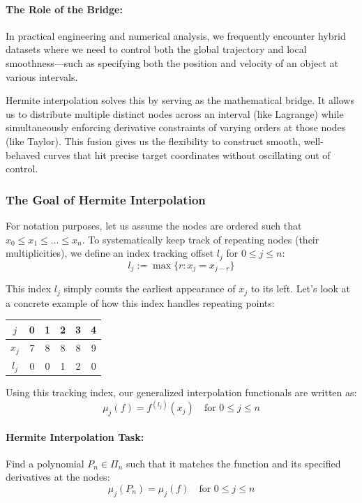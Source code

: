 \documentclass{article}
\begin{document}
\paragraph{The Role of the Bridge:} In practical engineering and numerical analysis, we frequently encounter hybrid datasets where we need to control both the global trajectory and local smoothness—such as specifying both the position and velocity of an object at various intervals. 

Hermite interpolation solves this by serving as the mathematical bridge. It allows us to distribute multiple distinct nodes across an interval (like Lagrange) while simultaneously enforcing derivative constraints of varying orders at those nodes (like Taylor). This fusion gives us the flexibility to construct smooth, well-behaved curves that hit precise target coordinates without oscillating out of control.

\subsubsection{The Goal of Hermite Interpolation}
For notation purposes, let us assume the nodes are ordered such that $x_0 \leq x_1 \leq \dots \leq x_n$. To systematically keep track of repeating nodes (their multiplicities), we define an index tracking offset $l_j$ for $0 \leq j \leq n$:
\[l_j := \max\{r : x_j = x_{j-r}\}\]

This index $l_j$ simply counts the earliest appearance of $x_j$ to its left. Let's look at a concrete example of how this index handles repeating points:

\begin{center}
  \begin{tabular}{|c|c|c|c|c|c|}
    \hline
    $j$ & 0 & 1 & 2 & 3 & 4 \\
    \hline
    $x_j$ & 7 & 8 & 8 & 8 & 9 \\
    \hline
    $l_j$ & 0 & 0 & 1 & 2 & 0 \\
    \hline
  \end{tabular}
\end{center}

Using this tracking index, our generalized interpolation functionals are written as:
\[\mu_j(f) = f^{(l_j)}(x_j) \quad \text{for } 0 \leq j \leq n\]

\paragraph{Hermite Interpolation Task:} Find a polynomial $P_n \in \Pi_n$ such that it matches the function and its specified derivatives at the nodes: 
\[\mu_j(P_n) = \mu_j(f) \quad \text{for } 0 \leq j \leq n\]
\end{document}
